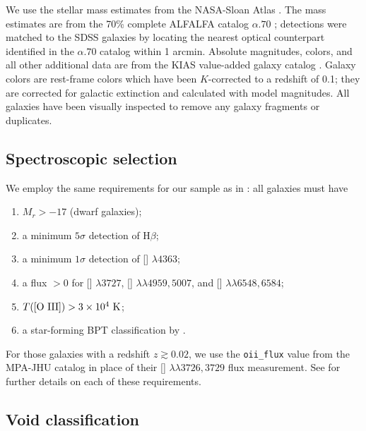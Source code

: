 We use the stellar mass estimates from the NASA-Sloan Atlas \citep{Blanton11}.  
The  mass estimates are from the 70\% complete ALFALFA catalog 
$\alpha.70$ \citep{Giovanelli05};  detections were matched to the SDSS 
galaxies by locating the nearest optical counterpart identified in the 
$\alpha.70$ catalog within 1 arcmin.  Absolute magnitudes, colors, and all other 
additional data are from the KIAS value-added galaxy catalog 
\citep{Choi10,Blanton05}.  Galaxy colors are rest-frame colors which have been 
$K$-corrected to a redshift of 0.1; they are corrected for galactic extinction 
and calculated with model magnitudes.  All galaxies have been visually inspected 
to remove any galaxy fragments or duplicates.


\subsection{Spectroscopic selection}\label{sec:SDSS_limits}

We employ the same requirements for our sample as in 
\cite{Douglass17a,Douglass17b}: all galaxies must have
\begin{enumerate}
    \item{$M_r > -17$ (dwarf galaxies);}
    \item{a minimum $5\sigma$ detection of H$\beta$;}
    \item{a minimum $1\sigma$ detection of [] $\lambda 4363$;}
    \item{a flux $> 0$ for [] $\lambda 3727$, [] $\lambda \lambda 4959,5007$, and [] $\lambda \lambda 6548,6584$;}
    \item{$T(\text{[\ion{O}{3}]}) > 3\times 10^4 \text{ K}$;}
    \item{a star-forming BPT classification by \cite{Brinchmann04}.}
\end{enumerate}

For those galaxies with a redshift $z \gtrsim 0.02$, we use the 
\texttt{oii\_flux} value from the MPA-JHU catalog in place of their [] 
$\lambda \lambda 3726,3729$ flux measurement.  See \cite{Douglass17a} for 
further details on each of these requirements.


\subsection{Void classification}

